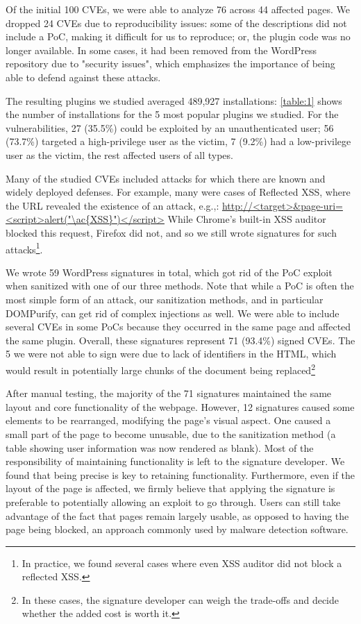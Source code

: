 Of the initial 100 CVEs, we were able to analyze 76 across 44 affected
pages. We dropped 24 CVEs due to reproducibility issues: some of the
descriptions did not include a PoC, making it difficult for us to
reproduce; or, the plugin code was no longer available. In some cases,
it had been removed from the WordPress repository due to "security
issues", which emphasizes the importance of being able to defend
against these attacks. %

The resulting plugins we studied averaged 489,927
installations: \autoref{table:1} shows the number of installations for
the 5 most popular plugins we studied. For the vulnerabilities, 27
(35.5\%) could be exploited by an unauthenticated user; 56 (73.7\%)
targeted a high-privilege user as the victim, 7 (9.2\%) had a
low-privilege user as the victim, the rest affected users of all
types.

Many of the studied CVEs included attacks for which there are known
and widely deployed defenses. For example, many were cases of
Reflected \ac{XSS}, where the URL revealed the existence of an attack,
e.g.,: \url{http://<target>&page-uri=<script>alert("\ac{XSS}")</script>}
While Chrome's built-in \ac{XSS} auditor blocked this request, Firefox
did not, and so we still wrote signatures for such attacks\footnote{In
practice, we found several cases where even XSS auditor did not block
a reflected XSS.}.

We wrote 59 WordPress signatures in total, which got rid of the PoC
exploit when sanitized with one of our three methods. Note that while
a PoC is often the most simple form of an attack, our sanitization
methods, and in particular DOMPurify, can get rid of complex
injections as well. We were able to include several CVEs in some PoCs
because they occurred in the same page and affected the same
plugin. Overall, these signatures represent 71 (93.4\%) signed
CVEs. The 5 we were not able to sign were due to lack of identifiers
in the HTML, which would result in potentially large chunks of the
document being replaced\footnote{In these cases, the signature developer
can weigh the trade-offs and decide whether the added cost is worth
it.}

After manual testing, the majority of the 71 signatures maintained the
same layout and core functionality of the webpage. However, 12
signatures caused some elements to be rearranged, modifying the page's
visual aspect. One caused a small part of the page to become unusable,
due to the sanitization method (a table showing user information
was now rendered as blank). Most of the responsibility of maintaining
functionality is left to the signature developer. We found that being precise
is key to retaining functionality. Furthermore, even if the layout of the page is
affected, we firmly believe that applying the signature is preferable
to potentially allowing an exploit to go through. Users can still take
advantage of the fact that pages remain largely usable, as opposed to
having the page being blocked, an approach commonly used by malware
detection software.

